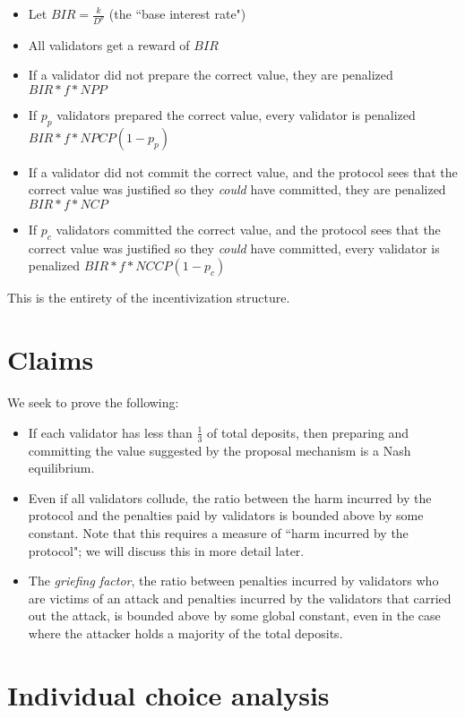 \documentclass[12pt]{article}
\begin{document}
\begin{itemize}
\item Let $BIR = \frac{k}{D^p}$ (the ``base interest rate")
\item All validators get a reward of $BIR$
\item If a validator did not prepare the correct value, they are penalized $BIR * f * NPP$
\item If $p_p$ validators prepared the correct value, every validator is penalized $BIR * f * NPCP(1 - p_p)$
\item If a validator did not commit the correct value, and the protocol sees that the correct value was justified so they \textit{could} have committed, they are penalized $BIR * f * NCP$
\item If $p_c$ validators committed the correct value, and the protocol sees that the correct value was justified so they \textit{could} have committed, every validator is penalized $BIR * f * NCCP(1 - p_c)$
\end{itemize}

This is the entirety of the incentivization structure.

\section{Claims}

We seek to prove the following:

\begin{itemize}
\item If each validator has less than $\frac{1}{3}$ of total deposits, then preparing and committing the value suggested by the proposal mechanism is a Nash equilibrium.
\item Even if all validators collude, the ratio between the harm incurred by the protocol and the penalties paid by validators is bounded above by some constant. Note that this requires a measure of ``harm incurred by the protocol"; we will discuss this in more detail later.
\item The \textit{griefing factor}, the ratio between penalties incurred by validators who are victims of an attack and penalties incurred by the validators that carried out the attack, is bounded above by some global constant, even in the case where the attacker holds a majority of the total deposits.
\end{itemize}

\section{Individual choice analysis}
\end{document}
